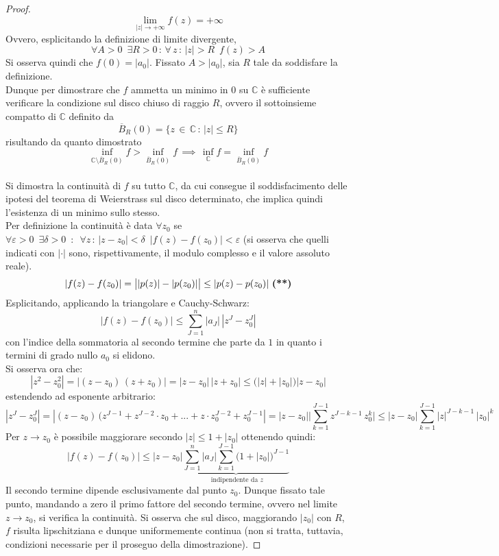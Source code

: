 \documentclass[10pt, oneside]{book}
\theoremstyle{plain}
\begin{document}
\begin{proof}
\[\lim\limits_{|z| \rightarrow +\infty}f(z) = + \infty\]
Ovvero, esplicitando la definizione di limite divergente,
\[\forall A > 0 \enspace \exists R > 0 \, : \, \forall \, z \, : \, |z| > R \enspace f(z) > A\]
Si osserva quindi che $f(0) = |a_0|$. Fissato $A > |a_0|$, sia $R$ tale da soddisfare la definizione. 
\\Dunque per dimostrare che $f$ ammetta un minimo in $0$ su $\mathbb{C}$ è sufficiente verificare la condizione sul disco chiuso di raggio $R$, ovvero il sottoinsieme compatto di $\mathbb{C}$ definito da
\[\overline{B}_R (0) = \{z \, \in \, \mathbb{C} \, : \, |z| \leq R \}\]
risultando da quanto dimostrato
\[\inf\limits_{\mathbb{C} \setminus \overline{B}_R(0)} f > \inf\limits_{\overline{B}_R(0)} f \, \implies \, \inf\limits_{\mathbb{C}} f = \inf\limits_{\overline{B}_R(0)} f\]
\\Si dimostra la continuità di $f$ su tutto $\mathbb{C}$, da cui consegue il soddisfacimento delle ipotesi del teorema di Weierstrass sul disco determinato, che implica quindi l'esistenza di un minimo sullo stesso.
\\Per definizione la continuità è data $\forall z_0$ se $\forall \varepsilon > 0 \enspace \exists \delta > 0 \enspace : \enspace \forall z \, : \, |z - z_0| < \delta  \enspace |f(z) - f(z_0)| < \varepsilon$ (si osserva che quelli indicati con $|\cdot |$ sono, rispettivamente, il modulo complesso e il valore assoluto reale).
\[|f(z) - f(z_0)| = \big||p(z)| - |p(z_0)|\big| \leq |p(z) - p(z_0)| \textrm{ \textbf{(**)}}\]
Esplicitando, applicando la triangolare e Cauchy-Schwarz:
\[|f(z) - f(z_0)| \leq \sum\limits_{J=1}^n |a_J| \, |z^J - z_0^J|\]
con l'indice della sommatoria al secondo termine che parte da $1$ in quanto i termini di grado nullo $a_0$ si elidono.
\\Si osserva ora che:
\[|z^2 - z_0^2| = |(z-z_0) \, (z+z_0)| = |z-z_0| \, |z+z_0| \leq \big(|z| + |z_0|\big)|z-z_0|\]
estendendo ad esponente arbitrario:
\[|z^J - z_0^J| = |(z-z_0) \, (z^{J-1} + z^{J-2}\cdot z_0 + ... + z \cdot z_0^{J-2} + z_0^{J-1}| = |z-z_0| \bigg|\sum\limits_{k=1}^{J-1} z^{J-k-1} \, z_0^{k}\bigg| \leq |z-z_0| \sum\limits_{k=1}^{J-1} |z|^{J-k-1} \, |z_0|^{k}\]
Per $z \rightarrow z_0$ è possibile maggiorare secondo $|z| \leq 1 + |z_0|$ ottenendo quindi:
\[|f(z) - f(z_0)| \leq |z-z_0| \underbrace{\sum\limits_{J=1}^n |a_J| \sum\limits_{k=1}^{J-1} \big( 1 + |z_0|\big)^{J-1}}_{\textrm{ indipendente da } z} \]
Il secondo termine dipende esclusivamente dal punto $z_0$. Dunque fissato tale punto, mandando a zero il primo fattore del secondo termine, ovvero nel limite $z \rightarrow z_0$, si verifica la continuità. Si osserva che sul disco, maggiorando $|z_0|$ con $R$, $f$ risulta lipschitziana e dunque uniformemente continua (non si tratta, tuttavia, condizioni necessarie per il proseguo della dimostrazione).

\end{proof}
\end{document}
